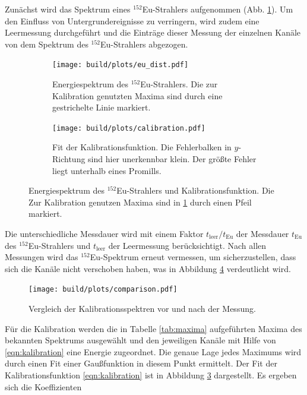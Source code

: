 Zunächst wird das Spektrum eines $^{152}$Eu-Strahlers aufgenommen (Abb.
\ref{fig:eu_uncalibrated}).
Um den Einfluss von Untergrundereignisse zu verringern, wird zudem eine
Leermessung durchgeführt und die Einträge dieser Messung der einzelnen Kanäle
von dem Spektrum des $^{152}$Eu-Strahlers abgezogen.
\begin{figure}[htb]
    \centering
    \begin{subfigure}[t]{.49\linewidth}
        \texttt{[image: build/plots/eu\_dist.pdf]}
        \caption{
            Energiespektrum des $^{152}$Eu-Strahlers. Die zur Kalibration
            genutzten Maxima sind durch eine gestrichelte Linie markiert.
        }
        \label{fig:eu_uncalibrated}
    \end{subfigure}%
    
    \begin{subfigure}[t]{.49\linewidth}
        \texttt{[image: build/plots/calibration.pdf]}
        \caption{
            Fit der Kalibrationsfunktion. Die Fehlerbalken in $y$-Richtung
            sind hier unerkennbar klein. Der größte Fehler liegt
            unterhalb eines Promills.
        }
        \label{fig:calibration}
    \end{subfigure}
    \caption{
        Energiespektrum des $^{152}$Eu-Strahlers und Kalibrationsfunktion.
        Die Zur Kalibration genutzen Maxima sind in \ref{fig:eu_uncalibrated}
        durch einen Pfeil markiert.
    }
\end{figure}
Die unterschiedliche Messdauer wird mit einem Faktor $t_\text{leer} / t_\text{Eu}$
der Messdauer $t_\text{Eu}$ des $^{152}$Eu-Strahlers und $t_\text{leer}$ der
Leermessung berücksichtigt.
Nach allen Messungen wird das $^{152}$Eu-Spektrum erneut vermessen,
um sicherzustellen, dass sich die Kanäle nicht verschoben haben, was in Abbildung
\ref{fig:control} verdeutlicht wird.
\begin{figure}
    \centering
    \texttt{[image: build/plots/comparison.pdf]}
    \caption{
        Vergleich der Kalibrationsspektren vor und nach der Messung.
    }
    \label{fig:control}
\end{figure}
Für die Kalibration werden die in Tabelle \ref{tab:maxima} aufgeführten
Maxima des bekannten Spektrums ausgewählt und den jeweiligen Kanäle mit
Hilfe von \eqref{eqn:kalibration} eine Energie zugeordnet.
Die genaue Lage jedes Maximums wird durch einen Fit einer Gaußfunktion in diesem
Punkt ermittelt.
Der Fit der Kalibrationsfunktion \eqref{eqn:kalibration} ist in Abbildung \ref{fig:calibration}
dargestellt. Es ergeben sich die Koeffizienten
